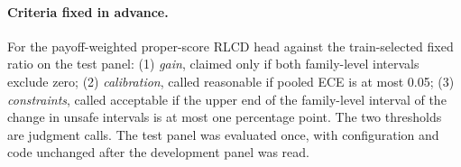 \documentclass[10pt]{article}
\begin{document}
\paragraph{Criteria fixed in advance.}
For the payoff-weighted proper-score RLCD head against the train-selected fixed ratio on the test panel: (1) \emph{gain}, claimed only if both family-level intervals exclude zero; (2) \emph{calibration}, called reasonable if pooled ECE is at most 0.05; (3) \emph{constraints}, called acceptable if the upper end of the family-level interval of the change in unsafe intervals is at most one percentage point. The two thresholds are judgment calls. The test panel was evaluated once, with configuration and code unchanged after the development panel was read.

\begin{table}[t]
\centering\small
\resizebox{\linewidth}{!}{}
\caption{Broadened run, mean utility on the twelve untouched test families (\TypedModelSeeds{} model seeds, \TypedTraceSeeds{} trace seeds each). The train-selected fixed ratio is \TypedBroadBaseRatio{}; the hindsight-best fixed ratio is chosen per family on the test traces.}\label{tab:typed-broad-families}
\end{table}

\begin{table}[t]
\centering\small
\resizebox{\linewidth}{!}{}
\caption{Broadened run, constraint violations and calibration on the untouched test families.}\label{tab:typed-broad-risk}
\end{table}

\begin{table}[t]
\centering\small
\resizebox{\linewidth}{!}{}
\caption{Broadened run, test-panel contrasts under the three uncertainty procedures. The train-selected ratio is also the hindsight-best ratio on this panel.}\label{tab:typed-broad-clustered}
\end{table}
\end{document}
